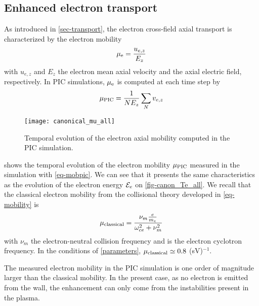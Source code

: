   \subsection{Enhanced electron transport} \label{subsec-canonmue}
  As introduced in \cref{sec-transport}, the electron cross-field axial transport is characterized by the electron mobility
  \begin{equation} \label{eq-mobdef}
    \mu_{\mathrm{e}} = \frac{u_{e, z}}{E_z}
  \end{equation}
  with $u_{e,z}$ and $E_z$ the electron mean axial velocity and the axial electric field, respectively.
  In \ac{PIC} simulations, $\mu_{\mathrm{e}}$ is computed at each time step by
  \begin{equation} \label{eq-mobpic}
    \mu_{\mathrm{PIC}} = \frac{1}{N E_z} \sum_N v_{e,z}
  \end{equation}

  \begin{figure}[hbt]
    \centering
    \texttt{[image: canonical\_mu\_all]}
    \caption{Temporal evolution of the electron axial mobility computed in the \acs{PIC} simulation.}
    \label{fig-canon_mu}
  \end{figure}
  
   shows the temporal evolution of the electron mobility $\mu_{\mathrm{PIC}}$ measured in the simulation with \cref{eq-mobpic}.
  We can see that it presents the same characteristics as the evolution of the electron energy ${\mathcal{E}_e}$ on \cref{fig-canon_Te_all}.
  We recall that the classical electron mobility from the collisional theory developed in \cref{eq-mobility} is \citep{lafleur2016a}
  \begin{equation} \label{eq-muclass}
    \mu_{\mathrm{classical}} = \frac{\nu_m \frac{e}{m_e}}{\omega_{ce}^2 + \nu_m^2}
  \end{equation}
  with $\nu_m$ the electron-neutral  collision frequency and \oce{} is the electron cyclotron frequency.
  In the conditions of \cref{parameters}, $\mu_{\mathrm{classical}} \simeq 0.8$ \square\meter(sV)$^{-1}$.
  
  The measured electron mobility in the \ac{PIC} simulation is one order of magnitude larger than the classical mobility.
  In the present case, as no electron is emitted from the wall, the enhancement can only come from the instabilities present in the plasma.

